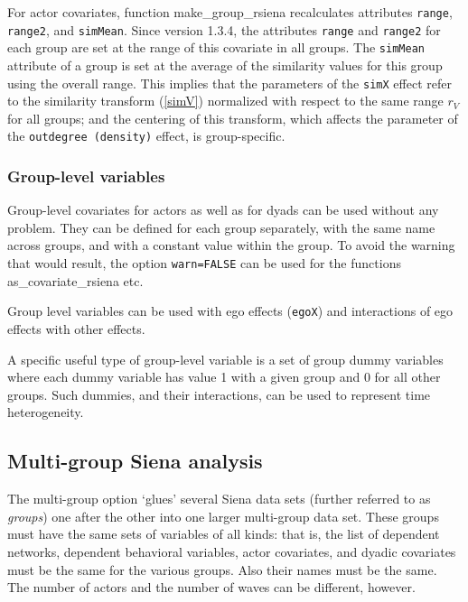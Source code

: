 \documentclass[a4paper,fleqn,11pt]{article}
\newcommand{\+}{\, + \,}
\newcommand{\sfn}[1]{\textsf{#1}}
\begin{document}
For actor covariates, function \textsf{make\_group\_rsiena} recalculates
attributes \texttt{range}, \texttt{range2}, and \texttt{simMean}.
Since version 1.3.4,
the attributes \texttt{range} and \texttt{range2} for each group are set
at the range of this covariate in all groups.
The \texttt{simMean} attribute
of a group is set at the average of the similarity values
for this group using the overall range.
This implies that the parameters of the \texttt{simX} effect refer
to the similarity transform (\ref{simV})
normalized with respect to the same range
$r_V$ for all groups; and the centering of this transform,
which affects the parameter of the \texttt{outdegree (density)} effect,
is group-specific.

\subsubsection{Group-level variables}

Group-level covariates for actors as well as for
dyads can be used without any problem. They can be defined for each
group separately, with the same name across groups,
and with a constant value within the group.
To avoid the warning that would result, the option \texttt{warn=FALSE}
can be used for the functions \sfn{as\_covariate\_rsiena} etc.

Group level variables can be used with ego effects (\texttt{egoX})
and interactions of ego effects with other effects.

A specific useful type of group-level variable is a set of group dummy
variables where each dummy variable has value 1 with a given group and
0 for all other groups.
Such dummies, and their interactions,
can be used to represent time heterogeneity.


\subsection{Multi-group Siena analysis}
\label{S_multigroup}

The multi-group option `glues' several Siena data sets
(further referred to as \emph{groups}) one after the other
into one larger multi-group data set.
These groups must have the same sets of variables of all kinds:
that is, the list of dependent networks, dependent behavioral variables,
actor covariates, and dyadic covariates must be the same
for the various groups.
Also their names must be the same.
The number of actors and the number of waves can be different, however.
\end{document}
